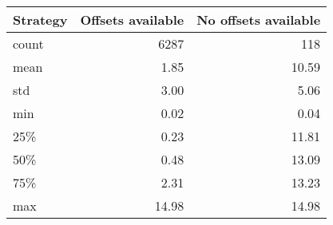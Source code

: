 \begin{tabular}{l|rr}
\toprule
Strategy &  Offsets available &  No offsets available \\
\midrule
count &            6287 &                118 \\
mean  &               1.85 &                 10.59 \\
std   &               3.00 &                  5.06 \\
min   &               0.02 &                  0.04 \\
25\%   &               0.23 &                 11.81 \\
50\%   &               0.48 &                 13.09 \\
75\%   &               2.31 &                 13.23 \\
max   &              14.98 &                 14.98 \\
\bottomrule
\end{tabular}
